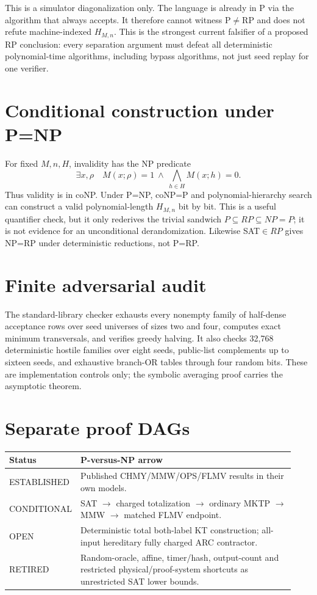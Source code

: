 \documentclass[11pt]{article}
\begin{document}
This is a simulator diagonalization only.  The language is already in P via
the algorithm that always accepts.  It therefore cannot witness P$\ne$RP and
does not refute machine-indexed $H_{M,n}$.  This is the strongest current
falsifier of a proposed RP conclusion: every separation argument must defeat
all deterministic polynomial-time algorithms, including bypass algorithms,
not just seed replay for one verifier.

\section*{Conditional construction under P=NP}
For fixed $M,n,H$, invalidity has the NP predicate
\[
 \exists x,\rho\quad M(x;\rho)=1\ \wedge\
          \bigwedge_{h\in H}M(x;h)=0.
\]
Thus validity is in coNP.  Under P=NP, coNP=P and polynomial-hierarchy search
can construct a valid polynomial-length $H_{M,n}$ bit by bit.  This is a useful
quantifier check, but it only rederives the trivial sandwich
$P\subseteq RP\subseteq NP=P$; it is not evidence for an unconditional
derandomization.  Likewise SAT$\in RP$ gives NP=RP under deterministic
reductions, not P=RP.

\section*{Finite adversarial audit}
The standard-library checker exhausts every nonempty family of half-dense
acceptance rows over seed universes of sizes two and four, computes exact
minimum transversals, and verifies greedy halving.  It also checks 32,768
deterministic hostile families over eight seeds, public-list complements up to
sixteen seeds, and exhaustive branch-OR tables through four random bits.
These are implementation controls only; the symbolic averaging proof carries
the asymptotic theorem.

\section*{Separate proof DAGs}
\begin{tabular}{p{0.18\linewidth}p{0.75\linewidth}}
\toprule
Status & P-versus-NP arrow \\
\midrule
ESTABLISHED & Published CHMY/MMW/OPS/FLMV results in their own models. \\
CONDITIONAL & SAT $\to$ charged totalization $\to$ ordinary MKTP $\to$ MMW
$\to$ matched FLMV endpoint. \\
OPEN & Deterministic total both-label KT construction; all-input hereditary
fully charged ARC contractor. \\
RETIRED & Random-oracle, affine, timer/hash, output-count and restricted
physical/proof-system shortcuts as unrestricted SAT lower bounds. \\
\bottomrule
\end{tabular}
\end{document}
